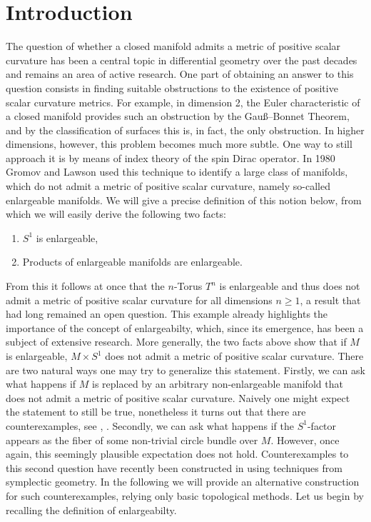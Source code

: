 \section{Introduction}

The question of whether a closed manifold admits a metric of positive scalar curvature has been a central topic in differential geometry over the past decades and remains an area of active research. One part of obtaining an answer to this question consists in finding suitable obstructions to the existence of positive scalar curvature metrics. For example, in dimension 2, the Euler characteristic of a closed manifold provides such an obstruction by the Gauß--Bonnet Theorem, and by the classification of surfaces this is, in fact, the only obstruction. In higher dimensions, however, this problem becomes much more subtle. One way to still approach it is by means of index theory of the spin Dirac operator. In 1980 Gromov and Lawson \cite{gromov1980spin} used this technique to identify a large class of manifolds, which do not admit a metric of positive scalar curvature, namely so-called enlargeable manifolds. We will give a precise definition of this notion below, from which we will easily derive the following two facts:

\begin{enumerate}[label=\arabic*.]
    \item $S^1$ is enlargeable,
    \item Products of enlargeable manifolds are enlargeable.
\end{enumerate}

From this it follows at once that the $n$-Torus $T^n$ is enlargeable and thus does not admit a metric of positive scalar curvature for all dimensions $n \geq 1$, a result that had long remained an open question. This example already highlights the importance of the concept of enlargeabilty, which, since its emergence, has been a subject of extensive research. More generally, the two facts above show that if $M$ is enlargeable, $M \times S^1$ does not admit a metric of positive scalar curvature. There are two natural ways one may try to generalize this statement. Firstly, we can ask what happens if $M$ is replaced by an arbitrary non-enlargeable manifold that does not admit a metric of positive scalar curvature. Naively one might expect the statement to still be true, nonetheless it turns out that there are counterexamples, see \cite[Remark 1.4]{cecchini2023nonnegative}, \cite[Counterexample 4.16]{stolz2014metrics}. Secondly, we can ask what happens if the $S^1$-factor appears as the fiber of some non-trivial circle bundle over $M$. However, once again, this seemingly plausible expectation does not hold. Counterexamples to this second question have recently been constructed in \cite{kumar2025circle} using techniques from symplectic geometry. In the following we will provide an alternative construction for such counterexamples, relying only basic topological methods. Let us begin by recalling the definition of enlargeabilty.

